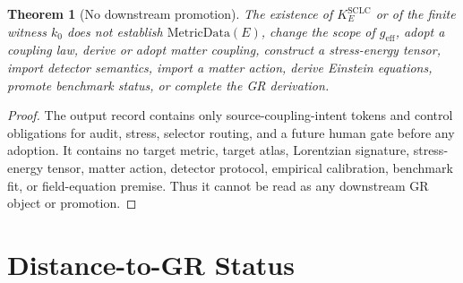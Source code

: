 \documentclass[11pt]{article}
\newcommand{\MetricData}{\mathrm{MetricData}}
\newcommand{\geff}{g_{\mathrm{eff}}}
\newtheorem{theorem}{Theorem}
\begin{document}
\begin{theorem}[No downstream promotion]
The existence of \(K^{\mathrm{SCLC}}_E\) or of the finite witness \(k_0\)
does not establish \(\MetricData(E)\), change the scope of \(\geff\), adopt a
coupling law, derive or adopt matter coupling, construct a stress-energy
tensor, import detector semantics, import a matter action, derive Einstein
equations, promote benchmark status, or complete the GR derivation.
\end{theorem}

\begin{proof}
The output record contains only source-coupling-intent tokens and control
obligations for audit, stress, selector routing, and a future human gate
before any adoption. It contains no target metric, target atlas, Lorentzian
signature, stress-energy tensor, matter action, detector protocol, empirical
calibration, benchmark fit, or field-equation premise. Thus it cannot be read
as any downstream GR object or promotion.
\end{proof}

\section{Distance-to-GR Status}
\end{document}
